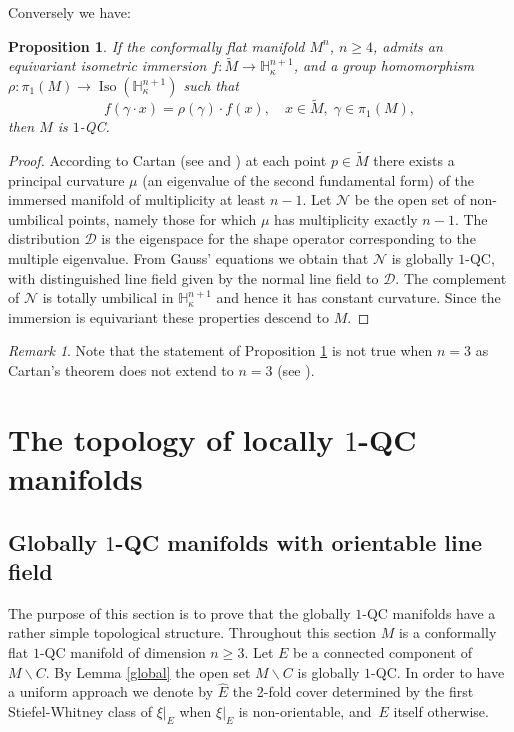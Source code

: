 \documentclass[JEP,XML,SOM,Unicode]{cedram}
\let\mathcal\mathscr
\let\moins\smallsetminus
\DeclareMathOperator{\Iso}{Iso}
\newtheorem{proposition}[theorem]{Proposition}
\theoremstyle{definition}
\theoremstyle{remark}
\newtheorem{remark}[theorem]{Remark}
\numberwithin{equation}{section}
\begin{document}
Conversely we have:
\begin{proposition}\label{characterize}
If the conformally flat manifold $M^n$, $n\geq4$, admits an equivariant isometric immersion
$f:\widetilde{M}\to \mathbb H_{\kappa}^{n+1}$, and
a group homomorphism $\rho:\pi_1(M)\to \Iso(\mathbb H_{\kappa}^{n+1})$ such that
\[ f(\gamma\cdot x)=\rho(\gamma)\cdot f(x),\quad x\in \widetilde{M},\; \gamma \in \pi_1(M),\]
then $M$ is $1$-QC.
\end{proposition}
\begin{proof}
According to Cartan
(see \cite{Ca} and \cite[Th.\,4]{La}) at each point $p\in \widetilde{M}$ there exists
a principal curvature $\mu$ (\ie an eigenvalue of the second fundamental form) of the immersed
manifold of multiplicity at least $n-1$.
Let $\mathcal N$ be the open set of non-umbilical points,
namely those for which $\mu$ has multiplicity exactly $n-1$. The distribution $\mathcal D$ is the eigenspace for the
shape operator corresponding to the multiple eigenvalue.
From Gauss' equations we obtain that $\mathcal N$ is globally $1$-QC, with distinguished line field given by the
normal line field to $\mathcal D$. The complement of $\mathcal N$ is totally umbilical in
$\mathbb H_{\kappa}^{n+1}$ and hence it has constant curvature. Since the immersion is equivariant
these properties descend to $M$.
\end{proof}
\begin{remark}
Note that the statement of Proposition \ref{characterize} is not true when $n=3$
as Cartan's theorem does not extend to $n=3$ (see \cite{La}).
\end{remark}

\section{The topology of locally \texorpdfstring{$1$}{1}-QC manifolds}\label{sec:3}
\subsection{Globally $1$-QC manifolds with orientable line field}
The purpose of this section is to prove that
the globally $1$-QC manifolds have a rather simple topological structure.
Throughout this section $M$ is a conformally flat $1$-QC manifold of dimension $n\geq3$.
Let $E$ be a connected component of $M\moins C$.
By Lemma \ref{global} the open set $M\moins C$ is globally $1$-QC.
In order to have a uniform approach we denote by $\widehat{E}$ the
2-fold cover determined by the first Stiefel-Whitney class of $\xi|_{E}$
when $\xi|_E$ is non-orientable, and~$E$ itself otherwise.
\end{document}
